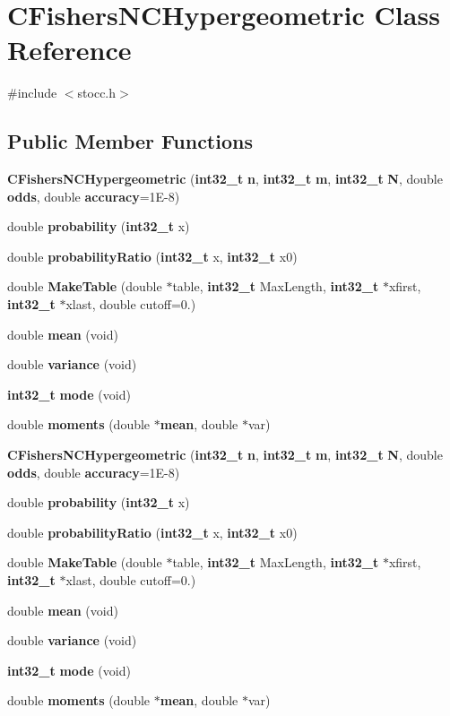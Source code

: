 \section{C\-Fishers\-N\-C\-Hypergeometric Class Reference}
\label{class_c_fishers_n_c_hypergeometric}


{\ttfamily \#include $<$stocc.\-h$>$}

\subsection*{Public Member Functions}
\begin{DoxyCompactItemize}
\item 
{\bf C\-Fishers\-N\-C\-Hypergeometric} ({\bf int32\-\_\-t} {\bf n}, {\bf int32\-\_\-t} {\bf m}, {\bf int32\-\_\-t} {\bf N}, double {\bf odds}, double {\bf accuracy}=1\-E-\/8)
\item 
double {\bf probability} ({\bf int32\-\_\-t} x)
\item 
double {\bf probability\-Ratio} ({\bf int32\-\_\-t} x, {\bf int32\-\_\-t} x0)
\item 
double {\bf Make\-Table} (double $\ast$table, {\bf int32\-\_\-t} Max\-Length, {\bf int32\-\_\-t} $\ast$xfirst, {\bf int32\-\_\-t} $\ast$xlast, double cutoff=0.)
\item 
double {\bf mean} (void)
\item 
double {\bf variance} (void)
\item 
{\bf int32\-\_\-t} {\bf mode} (void)
\item 
double {\bf moments} (double $\ast${\bf mean}, double $\ast$var)
\item 
{\bf C\-Fishers\-N\-C\-Hypergeometric} ({\bf int32\-\_\-t} {\bf n}, {\bf int32\-\_\-t} {\bf m}, {\bf int32\-\_\-t} {\bf N}, double {\bf odds}, double {\bf accuracy}=1\-E-\/8)
\item 
double {\bf probability} ({\bf int32\-\_\-t} x)
\item 
double {\bf probability\-Ratio} ({\bf int32\-\_\-t} x, {\bf int32\-\_\-t} x0)
\item 
double {\bf Make\-Table} (double $\ast$table, {\bf int32\-\_\-t} Max\-Length, {\bf int32\-\_\-t} $\ast$xfirst, {\bf int32\-\_\-t} $\ast$xlast, double cutoff=0.)
\item 
double {\bf mean} (void)
\item 
double {\bf variance} (void)
\item 
{\bf int32\-\_\-t} {\bf mode} (void)
\item 
double {\bf moments} (double $\ast${\bf mean}, double $\ast$var)
\end{DoxyCompactItemize}
